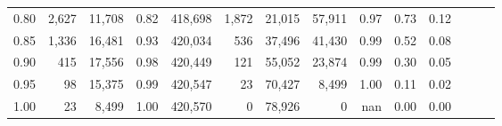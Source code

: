 \begin{tabular}{rrrrrrrrrrrrrr}
0.80 &   2,627 &  11,708 &  0.82 &  418,698 &    1,872 &  21,015 &  57,911 &  0.97 &  0.73 &      0.12 \\
0.85 &   1,336 &  16,481 &  0.93 &  420,034 &      536 &  37,496 &  41,430 &  0.99 &  0.52 &      0.08 \\
0.90 &     415 &  17,556 &  0.98 &  420,449 &      121 &  55,052 &  23,874 &  0.99 &  0.30 &      0.05 \\
0.95 &      98 &  15,375 &  0.99 &  420,547 &       23 &  70,427 &   8,499 &  1.00 &  0.11 &      0.02 \\
1.00 &      23 &   8,499 &  1.00 &  420,570 &        0 &  78,926 &       0 &   nan &  0.00 &      0.00 \\
\bottomrule
\end{tabular}
